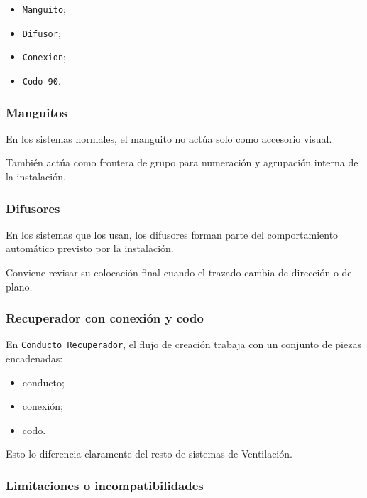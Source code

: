 \begin{itemize}
\item \texttt{Manguito};
\item \texttt{Difusor};
\item \texttt{Conexion};
\item \texttt{Codo 90}.
\end{itemize}

\subsubsection{Manguitos}

En los sistemas normales, el manguito no actúa solo como accesorio visual.

También actúa como frontera de grupo para numeración y agrupación interna de la instalación.


\subsubsection{Difusores}

En los sistemas que los usan, los difusores forman parte del comportamiento automático previsto por la instalación.

Conviene revisar su colocación final cuando el trazado cambia de dirección o de plano.


\subsubsection{Recuperador con conexión y codo}

En \texttt{Conducto Recuperador}, el flujo de creación trabaja con un conjunto de piezas encadenadas:

\begin{itemize}
\item conducto;
\item conexión;
\item codo.
\end{itemize}

Esto lo diferencia claramente del resto de sistemas de Ventilación.


\subsubsection{Limitaciones o incompatibilidades}

